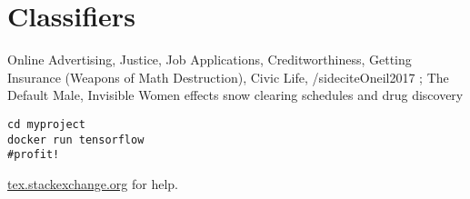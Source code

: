 \setchapterpreamble[u]{\margintoc}
\chapter{Classifiers}


Online Advertising, Justice, Job Applications, Creditworthiness, Getting Insurance (Weapons of Math Destruction), Civic Life, /sidecite{Oneil2017} ; The Default Male, Invisible Women effects snow clearing schedules and drug discovery 

\begin{lstlisting}[style=kaolstplain,linewidth=1.5\textwidth]
cd myproject
docker run tensorflow
#profit!
\end{lstlisting}

\url{tex.stackexchange.org} for help.
